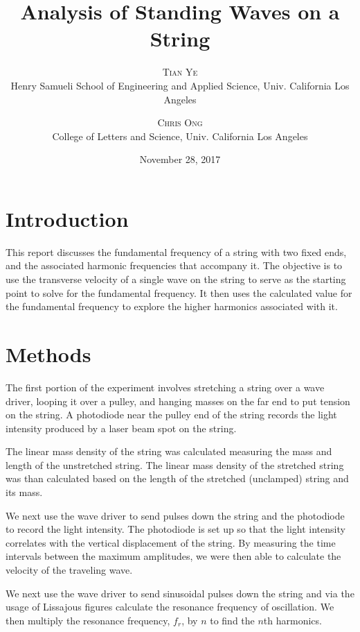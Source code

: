 \documentclass[twoside,twocolumn]{article}
\title{Analysis of Standing Waves on a String} %
\author{%
\textsc{Tian Ye} \\%
\normalsize Henry Samueli School of Engineering and Applied Science, Univ. California Los Angeles \\ %
\and %
\textsc{Chris Ong} \\%
\normalsize College of Letters and Science, Univ. California Los Angeles \\ %
}
\date{November 28, 2017} %
\begin{document}
\maketitle


\section{Introduction}

This report discusses the fundamental frequency of a string with two fixed ends, and the associated harmonic frequencies that accompany it. The objective is to use the transverse velocity of a single wave on the string to serve as the starting point to solve for the fundamental frequency. It then uses the calculated value for the fundamental frequency to explore the higher harmonics associated with it.


\section{Methods}

The first portion of the experiment involves stretching a string over a wave driver, looping it over a pulley, and hanging masses on the far end to put tension on the string. A photodiode near the pulley end of the string records the light intensity produced by a laser beam spot on the string.

\noindent The linear mass density of the string was calculated measuring the mass and length of the unstretched string. The linear mass density of the stretched string was than calculated based on the length of the stretched (unclamped) string and its mass.

\noindent We next use the wave driver to send pulses down the string and the photodiode to record the light intensity. The photodiode is set up so that the light intensity correlates with the vertical displacement of the string. By measuring the time intervals between the maximum amplitudes, we were then able to calculate the velocity of the traveling wave.

\noindent We next use the wave driver to send sinusoidal pulses down the string and via the usage of Lissajous figures calculate the resonance frequency of oscillation. We then multiply the resonance frequency, $f_r$, by $n$ to find the $n$th harmonics.
\end{document}
